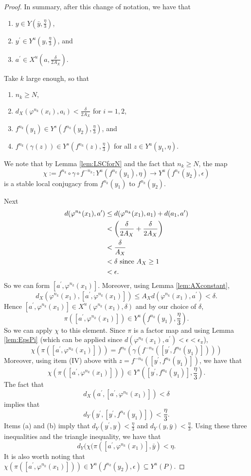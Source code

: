 \documentclass{amsart}
\theoremstyle{plain}
\theoremstyle{definition}
\theoremstyle{remark}
\begin{document}
\begin{proof}
In summary, after this change of notation, we have that
\begin{enumerate}
\item[(a)] $y \in Y(\bar{y}, \frac{\eta}{3} )$, 
\item[(b)] $y^{\prime} \in Y^u(y, \frac{\eta}{3})$, and
\item[(c)] $a^{\prime} \in X^u(a, \frac{\delta}{2A_X})$.
\end{enumerate}
Take $k$ large enough, so that
\begin{enumerate}
\item[(I)] $n_k \ge N$,
\item[(II)] $d_X(\varphi^{n_k}(x_i), a_i)< \frac{\delta}{2A_X}$ for $i=1, 2$,
\item[(III)] $f^{n_k}(y_1) \in Y^s(f^{n_k}(y_2), \frac{\eta}{3})$, and
\item[(IV)] $f^{n_k}(\gamma(z)) \in Y^s(f^{n_k}(z),  \frac{\eta}{3})$ for all $z \in Y^u(y_1, \eta)$.
\end{enumerate}
We note that by Lemma \ref{lem:LSCforN} and the fact that $n_k\ge N$, the map 
\[ \chi:=f^{n_k} \circ \gamma \circ f^{-n_k}: Y^u(f^{n_k}(y_1), \eta) \rightarrow Y^u(f^{n_k}(y_2), \epsilon)
\] 
is a stable local conjugacy from $f^{n_k}(y_1)$ to $f^{n_k}(y_2)$.

Next
\begin{align*}
d(\varphi^{n_k}(x_1), a^{\prime}) & \le   d(\varphi^{n_k}(x_1), a_1) + d(a_1, a^{\prime}) \\
& <  \left( \frac{\delta}{2A_X} + \frac{\delta}{2A_X}\right) \\
& < \frac{\delta}{A_X} \\
& < \delta \hbox{ since }A_X\ge 1 \\
& < \epsilon.
\end{align*}
So we can form $[a^{\prime}, \varphi^{n_k}(x_1)]$. Moreover, using Lemma \ref{lem:AXconstant},
\[
d_X(\varphi^{n_k}(x_1), [a^{\prime}, \varphi^{n_k}(x_1)]) \le A_X d(\varphi^{n_k}(x_1), a^{\prime}) < \delta.
\]
Hence $[a^{\prime}, \varphi^{n_k}(x_1)] \in X^u(\varphi^{n_k}(x_1), \delta)$ and by our choice of $\delta$, 
\[
\pi( [a^{\prime}, \varphi^{n_k}(x_1)] ) \in Y^u\left(f^{n_k}(y_1), \frac{\eta}{3}\right).
\]
So we can apply $\chi$ to this element. Since $\pi$ is a factor map and using Lemma \ref{lem:EpsPi} (which can be applied since $d(\varphi^{n_k}(x_1), a^{\prime})< \epsilon < \epsilon_{\pi}$),
\[
\chi(\pi( [a^{\prime}, \varphi^{n_k}(x_1)] ))=f^{n_k} ( \gamma (f^{-n_k}([ y^{\prime}, f^{n_k}(y_1)])))
\]
Moreover, using item (IV) above with $z=f^{-n_k}([ y^{\prime}, f^{n_k}(y_1)])$, we have that 
\[ \chi(\pi( [a^{\prime}, \varphi^{n_k}(x_1)] )) \in Y^s\left([ y^{\prime}, f^{n_k}(y_1)] , \frac{\eta}{3}\right).
\] 
The fact that 
\[
d_X(a^{\prime}, [a^{\prime}, \varphi^{n_k}(x_1)]) < \delta
\]
implies that
\[
d_Y(y^{\prime}, [y^{\prime}, f^{n_k}(y_1)])< \frac{\eta}{3}.
\]
Items (a) and (b) imply that $d_Y(y^{\prime}, y)< \frac{\eta}{3}$ and $d_Y(y, \bar{y})< \frac{\eta}{3}$. Using these three inequalities and the triangle inequality, we have that
\[ d_Y(\chi(\pi( [a^{\prime}, \varphi^{n_k}(x_1)], \bar{y}) < \eta.
\]
It is also worth noting that $\chi(\pi( [a^{\prime}, \varphi^{n_k}(x_1)])) \in Y^u(f^{n_k}(y_2), \epsilon) \subseteq Y^u(P)$.


\end{proof}
\end{document}
